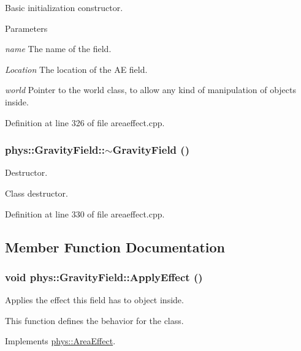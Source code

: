 Basic initialization constructor. 
\begin{DoxyParams}{Parameters}
\item[{\em name}]The name of the field. \item[{\em Location}]The location of the AE field. \item[{\em world}]Pointer to the world class, to allow any kind of manipulation of objects inside. \end{DoxyParams}


Definition at line 326 of file areaeffect.cpp.

\hypertarget{classphys_1_1GravityField_ae41a656b247a2982da2e1ae666c605d0}{
\subsubsection[{$\sim$GravityField}]{\setlength{\rightskip}{0pt plus 5cm}phys::GravityField::$\sim$GravityField ()}}
\label{d4/d8a/classphys_1_1GravityField_ae41a656b247a2982da2e1ae666c605d0}


Destructor. 

Class destructor. 

Definition at line 330 of file areaeffect.cpp.



\subsection{Member Function Documentation}
\hypertarget{classphys_1_1GravityField_a0322cb1635bbcb951493d9e17cc9acb1}{
\subsubsection[{ApplyEffect}]{\setlength{\rightskip}{0pt plus 5cm}void phys::GravityField::ApplyEffect ()}}
\label{d4/d8a/classphys_1_1GravityField_a0322cb1635bbcb951493d9e17cc9acb1}


Applies the effect this field has to object inside. 

This function defines the behavior for the class. 

Implements \hyperlink{classphys_1_1AreaEffect_a3b285ecfcf9c9200662d510e48dd222a}{phys::AreaEffect}.



